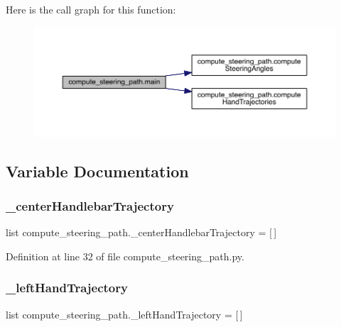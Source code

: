 Here is the call graph for this function\+:\nopagebreak
\begin{figure}[H]
\begin{center}
\leavevmode
\includegraphics[width=350pt]{namespacecompute__steering__path_a595f095c82464b1e9ee202094f3988f6_cgraph}
\end{center}
\end{figure}


\subsection{Variable Documentation}
\mbox{\label{namespacecompute__steering__path_af3ecc414817ba429eb9b24c06e91efe6}} 
\subsubsection{\texorpdfstring{\_centerHandlebarTrajectory}{\_centerHandlebarTrajectory}}
{\footnotesize\ttfamily list compute\+\_\+steering\+\_\+path.\+\_\+center\+Handlebar\+Trajectory = \mbox{[}$\,$\mbox{]}\hspace{0.3cm}{\ttfamily [private]}}



Definition at line 32 of file compute\+\_\+steering\+\_\+path.\+py.

\mbox{\label{namespacecompute__steering__path_a20e0028691b419d3f7721c0acd4a06ac}} 
\subsubsection{\texorpdfstring{\_leftHandTrajectory}{\_leftHandTrajectory}}
{\footnotesize\ttfamily list compute\+\_\+steering\+\_\+path.\+\_\+left\+Hand\+Trajectory = \mbox{[}$\,$\mbox{]}\hspace{0.3cm}{\ttfamily [private]}}




